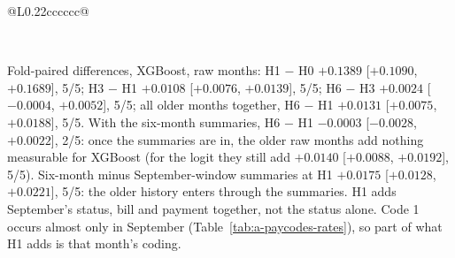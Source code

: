 \begin{table}[!htbp]
\begin{tabular}{@{}L{0.22\linewidth}cccccc@{}}
    \bottomrule
  \end{tabular}
  \\[3pt]\begin{minipage}{\linewidth}\footnotesize Fold-paired differences, XGBoost, raw months: H1 $-$ H0 $+0.1389$ [$+0.1090$, $+0.1689$], 5/5; H3 $-$ H1 $+0.0108$ [$+0.0076$, $+0.0139$], 5/5; H6 $-$ H3 $+0.0024$ [$-0.0004$, $+0.0052$], 5/5; all older months together, H6 $-$ H1 $+0.0131$ [$+0.0075$, $+0.0188$], 5/5. With the six-month summaries, H6 $-$ H1 $-0.0003$ [$-0.0028$, $+0.0022$], 2/5: once the summaries are in, the older raw months add nothing measurable for XGBoost (for the logit they still add $+0.0140$ [$+0.0088$, $+0.0192$], 5/5). Six-month minus September-window summaries at H1 $+0.0175$ [$+0.0128$, $+0.0221$], 5/5: the older history enters through the summaries. H1 adds September's status, bill and payment together, not the status alone. Code 1 occurs almost only in September (Table~\ref{tab:a-paycodes-rates}), so part of what H1 adds is that month's coding.\end{minipage}
\end{table}

